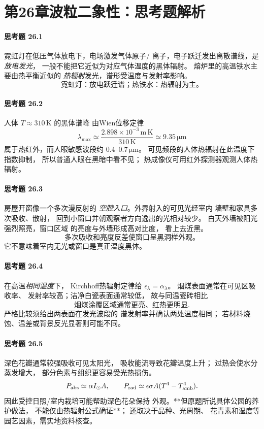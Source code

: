\section*{第26章\quad 波粒二象性：思考题解析}
\paragraph{思考题 26.1}
霓虹灯在低压气体放电下，电场激发气体原子/
离子，电子跃迁发出离散谱线，是\emph{放电发光}，
一般不能把它近似为对应气体温度的黑体辐射。
熔炉里的高温铁水主要由热平衡近似的
\emph{热辐射}发光，谱形受温度与发射率影响。
\[
\boxed{\text{霓虹灯：放电跃迁谱；热铁水：热辐射为主。}}
\]

\paragraph{思考题 26.2}
人体 \(T\approx310\,\mathrm K\) 的黑体谱峰
由Wien位移定律
\[
\boxed{\lambda_{\max}\simeq
\frac{2.898\times10^{-3}\,\mathrm{m\,K}}{310\,\mathrm K}
\simeq9.35\,\mathrm{\mu m}}
\]
属于热红外，而人眼敏感波段约
\(0.4\)--\(0.7\,\mathrm{\mu m}\)。
可见频段的人体热辐射在此温度下指数抑制，
所以普通人眼在黑暗中看不见；
热成像仪可用红外探测器观测人体热辐射。

\paragraph{思考题 26.3}
房屋开窗像一个多次漫反射的
\emph{空腔入口}。外界射入的可见光经室内
墙壁和家具多次吸收、散射，
回到小窗口并朝观察者方向逸出的光相对较少。
白天外墙被阳光强烈照亮，窗口区域
的亮度与外墙形成高对比度，
看上去近黑。
\[
\boxed{\text{多次吸收和亮度反差使窗口呈黑洞样外观。}}
\]
它不意味着室内无光或窗口是真正温度黑体。

\paragraph{思考题 26.4}
在高温\emph{相同温度}下，
Kirchhoff热辐射定律给
\(\epsilon_\lambda=\alpha_\lambda\)。
烟煤表面通常在可见区吸收率、
发射率较高；洁净白瓷表面通常较低，
故与同温瓷砖相比
\[
\boxed{\text{烟煤涂覆区域通常更亮、红热更明显}}.
\]
严格比较须给出两表面在发光波段的
谱发射率并确认两处温度相同；
若材料烧蚀、温差或背景反光显著则可能不同。

\paragraph{思考题 26.5}
深色花瓣通常较强吸收可见太阳光，
吸收能流导致花瓣温度上升；
过热会使水分蒸发增大，
部分色素与组织更容易受光热损伤。
\[
P_{\rm abs}\simeq\alpha I_{\odot}A,\qquad
P_{\rm rad}\simeq\epsilon\sigma A(T^4-T_{\rm amb}^4).
\]
因此受控日照/室内栽培可能帮助深色花朵保持
外观。**但原题所说具体公园的养护做法，
不能仅由热辐射公式确证**；
还取决于品种、光周期、
花青素和湿度等园艺因素，需实地资料核查。

